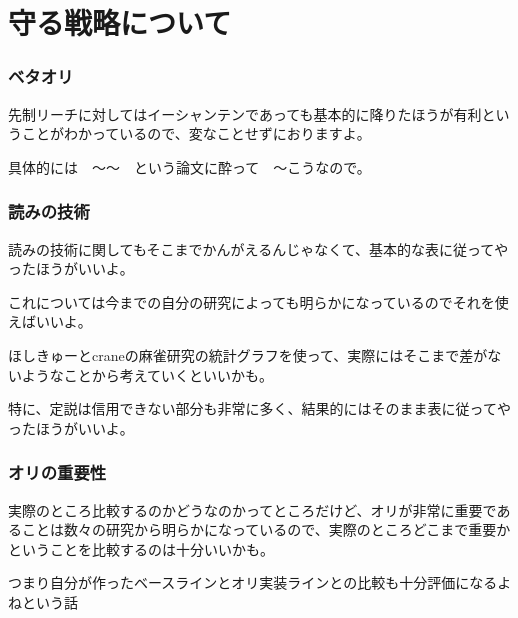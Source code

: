 \chapter{守る戦略について}

\subsection{ベタオリ}

先制リーチに対してはイーシャンテンであっても基本的に降りたほうが有利ということがわかっているので、変なことせずにおりますよ。

具体的には　〜〜　という論文に酔って　〜こうなので。

\subsection{読みの技術}

読みの技術に関してもそこまでかんがえるんじゃなくて、基本的な表に従ってやったほうがいいよ。

これについては今までの自分の研究によっても明らかになっているのでそれを使えばいいよ。

ほしきゅーとcraneの麻雀研究の統計グラフを使って、実際にはそこまで差がないようなことから考えていくといいかも。

特に、定説は信用できない部分も非常に多く、結果的にはそのまま表に従ってやったほうがいいよ。

\subsection{オリの重要性}

実際のところ比較するのかどうなのかってところだけど、オリが非常に重要であることは数々の研究から明らかになっているので、実際のところどこまで重要かということを比較するのは十分いいかも。

つまり自分が作ったベースラインとオリ実装ラインとの比較も十分評価になるよねという話

